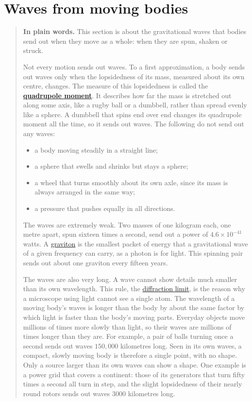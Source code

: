 \section{Waves from moving bodies}\label{sec:waves}

\begin{quote}
\textbf{In plain words.} This section is about the gravitational waves that
bodies send out when they move as a whole: when they are spun, shaken or
struck.

Not every motion sends out waves. To a first approximation, a body sends out
waves only when the lopsidedness of its mass, measured about its own centre,
changes. The measure of this
lopsidedness is called the
\textbf{\href{https://en.wikipedia.org/wiki/Quadrupole_formula}{quadrupole
moment}}. It describes how far the mass is stretched out along some axis, like
a rugby ball or a dumbbell, rather than spread evenly like a sphere. A dumbbell
that spins end over end changes its quadrupole moment all the time, so it sends
out waves. The following do not send out any waves:
\begin{itemize}
\item a body moving steadily in a straight line;
\item a sphere that swells and shrinks but stays a sphere;
\item a wheel that turns smoothly about its own axle, since its mass is always
arranged in the same way;
\item a pressure that pushes equally in all directions.
\end{itemize}

The waves are extremely weak. Two masses of one kilogram each, one metre apart,
spun sixteen times a second, send out a power of $4.6\times10^{-41}$ watts. A
\href{https://en.wikipedia.org/wiki/Graviton}{graviton} is the smallest
packet of energy that a gravitational wave of a given frequency can carry, as a photon is for light. This
spinning pair sends out about one graviton every fifteen years.

The waves are also very long. A wave cannot show details much smaller than its
own wavelength. This rule, the
\href{https://en.wikipedia.org/wiki/Diffraction-limited_system}{diffraction
limit}, is the reason why a microscope using light cannot see a single atom.
The wavelength of a moving body's waves is longer than the body by about the
same factor by which light is faster than the body's moving parts. Everyday
objects move millions of times more slowly than light, so their waves are
millions of times longer than they are. For example, a pair of balls turning
once a second sends out waves $150{,}000$ kilometres long. Seen in its own
waves, a compact, slowly moving body is therefore a single point, with no
shape. Only a source larger than its own waves can show a shape. One example
is a power grid that covers a continent: those of its generators that turn fifty
times a second all turn in step, and the slight lopsidedness of their nearly
round rotors sends out waves $3000$ kilometres long.


\end{quote}
